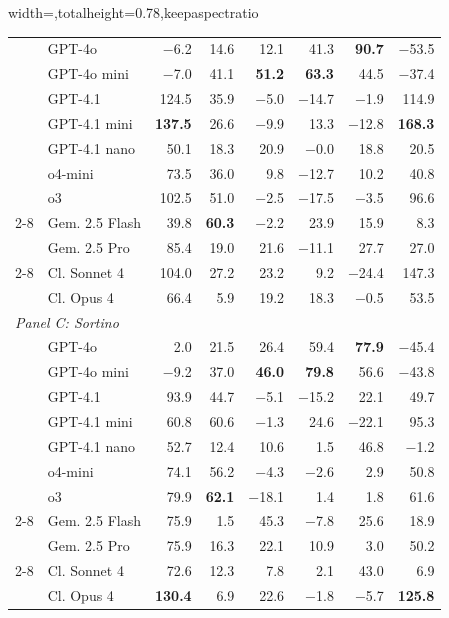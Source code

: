 \begin{table}[H]
\begin{adjustbox}{width=\textwidth,totalheight=0.78\textheight,keepaspectratio}
\begin{tabular}{ll rrrrrr}
\midrule
& GPT-4o & $-$6.2 & 14.6 & 12.1 & 41.3 & \textbf{90.7} & $-$53.5 \\
& GPT-4o mini & $-$7.0 & 41.1 & \textbf{51.2} & \textbf{63.3} & 44.5 & $-$37.4 \\
& GPT-4.1 & 124.5 & 35.9 & $-$5.0 & $-$14.7 & $-$1.9 & 114.9 \\
& GPT-4.1 mini & \textbf{137.5} & 26.6 & $-$9.9 & 13.3 & $-$12.8 & \textbf{168.3} \\
& GPT-4.1 nano & 50.1 & 18.3 & 20.9 & $-$0.0 & 18.8 & 20.5 \\
& o4-mini & 73.5 & 36.0 & 9.8 & $-$12.7 & 10.2 & 40.8 \\
& o3 & 102.5 & 51.0 & $-$2.5 & $-$17.5 & $-$3.5 & 96.6 \\
\cmidrule(l){2-8}
& Gem. 2.5 Flash & 39.8 & \textbf{60.3} & $-$2.2 & 23.9 & 15.9 & 8.3 \\
& Gem. 2.5 Pro & 85.4 & 19.0 & 21.6 & $-$11.1 & 27.7 & 27.0 \\
\cmidrule(l){2-8}
& Cl. Sonnet 4 & 104.0 & 27.2 & 23.2 & 9.2 & $-$24.4 & 147.3 \\
& Cl. Opus 4 & 66.4 & 5.9 & 19.2 & 18.3 & $-$0.5 & 53.5 \\
\midrule
\multicolumn{8}{l}{\textit{Panel C: Sortino}} \\
\midrule
& GPT-4o & 2.0 & 21.5 & 26.4 & 59.4 & \textbf{77.9} & $-$45.4 \\
& GPT-4o mini & $-$9.2 & 37.0 & \textbf{46.0} & \textbf{79.8} & 56.6 & $-$43.8 \\
& GPT-4.1 & 93.9 & 44.7 & $-$5.1 & $-$15.2 & 22.1 & 49.7 \\
& GPT-4.1 mini & 60.8 & 60.6 & $-$1.3 & 24.6 & $-$22.1 & 95.3 \\
& GPT-4.1 nano & 52.7 & 12.4 & 10.6 & 1.5 & 46.8 & $-$1.2 \\
& o4-mini & 74.1 & 56.2 & $-$4.3 & $-$2.6 & 2.9 & 50.8 \\
& o3 & 79.9 & \textbf{62.1} & $-$18.1 & 1.4 & 1.8 & 61.6 \\
\cmidrule(l){2-8}
& Gem. 2.5 Flash & 75.9 & 1.5 & 45.3 & $-$7.8 & 25.6 & 18.9 \\
& Gem. 2.5 Pro & 75.9 & 16.3 & 22.1 & 10.9 & 3.0 & 50.2 \\
\cmidrule(l){2-8}
& Cl. Sonnet 4 & 72.6 & 12.3 & 7.8 & 2.1 & 43.0 & 6.9 \\
& Cl. Opus 4 & \textbf{130.4} & 6.9 & 22.6 & $-$1.8 & $-$5.7 & \textbf{125.8} \\
\bottomrule
\end{tabular}
\end{adjustbox}
\end{table}

